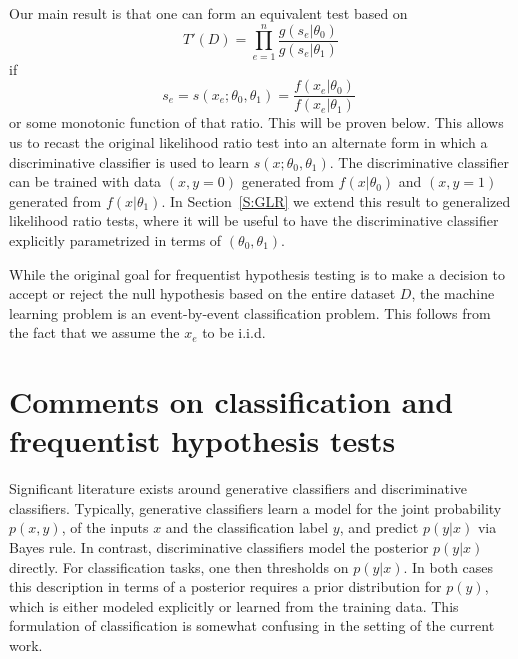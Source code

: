 \documentclass[11pt, oneside]{article}   	%
\begin{document}
Our main result is that one can form an equivalent test based on 
\begin{equation}\label{eq:equivLRtest}
T'(D) = \prod_{e=1}^n \frac{ g(s_e | \theta_0)}{ g(s_e | \theta_1)}
\end{equation}
if 
\begin{equation}
s_e = s(x_e; \theta_0, \theta_1) = \frac{ f(x_e|\theta_0)}{ f(x_e|\theta_1)} \; 
\end{equation}
or some monotonic function of that ratio. This will be proven below.
This allows us to recast the original likelihood ratio test into an alternate form in which a discriminative classifier is 
used to learn $s(x; \theta_0, \theta_1)$. The discriminative classifier can be trained with data $(x,y=0)$ generated 
from $f(x|\theta_0)$ and $(x,y=1)$ generated from $f(x|\theta_1)$. In Section~\ref{S:GLR} we extend this result to generalized likelihood ratio tests, where it will be useful to have the discriminative classifier explicitly parametrized in terms of $(\theta_0, \theta_1)$.

While the original goal for frequentist hypothesis testing is to make a decision to accept or reject the null hypothesis based on the entire dataset $D$, the machine learning problem is an event-by-event classification problem. This follows from the fact that we assume the $x_e$ to be i.i.d.

\section{Comments on classification and frequentist hypothesis tests}

Significant literature exists around generative classifiers and discriminative classifiers. Typically, generative classifiers learn a model for the joint probability $p(x,y)$, of the inputs $x$ and the classification label $y$, and predict $p(y|x)$ via Bayes rule. In contrast, discriminative classifiers model the posterior $p(y|x)$ directly. For classification tasks, one then thresholds on $p(y|x)$. In both cases this description in terms of a posterior requires a prior distribution for $p(y)$, which is either modeled explicitly or learned from the training data. 
This formulation of classification is somewhat confusing in the setting of the current work. 
\end{document}

